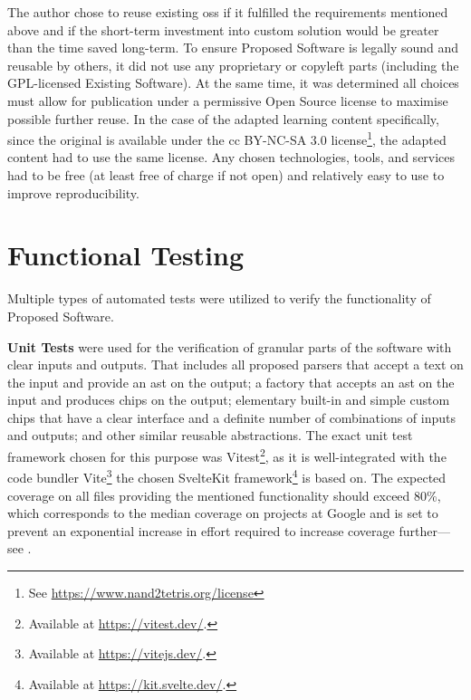 The author chose to reuse existing \gls{oss} if it fulfilled the requirements mentioned above and if the short-term investment into custom solution would be greater than the time saved long-term.
To ensure Proposed Software is legally sound and reusable by others, it did not use any proprietary or copyleft parts (including the GPL-licensed Existing Software).
At the same time, it was determined all choices must allow for publication under a permissive Open Source license to maximise possible further reuse.
In the case of the adapted learning content specifically, since the original is available under the \gls{cc} BY-NC-SA 3.0 license\footnote{See \url{https://www.nand2tetris.org/license}}, the adapted content had to use the same license.
Any chosen technologies, tools, and services had to be free (at least free of charge if not open) and relatively easy to use to improve reproducibility.

\section{Functional Testing}

Multiple types of automated tests were utilized to verify the functionality of Proposed Software.

\textbf{Unit Tests} were used for the verification of granular parts of the software with clear inputs and outputs.
That includes all proposed parsers that accept a text on the input and provide an \gls{ast} on the output; a factory that accepts an \gls{ast} on the input and produces chips on the output; elementary built-in and simple custom chips that have a clear interface and a definite number of combinations of inputs and outputs; and other similar reusable abstractions.
The exact unit test framework chosen for this purpose was Vitest\footnote{Available at \url{https://vitest.dev/}.}, as it is well-integrated with the code bundler Vite\footnote{Available at \url{https://vitejs.dev/}.} the chosen SvelteKit framework\footnote{Available at \url{https://kit.svelte.dev/}.} is based on.
The expected coverage on all files providing the mentioned functionality should exceed 80\%, which corresponds to the median coverage on projects at Google and is set to prevent an exponential increase in effort required to increase coverage further---see .

